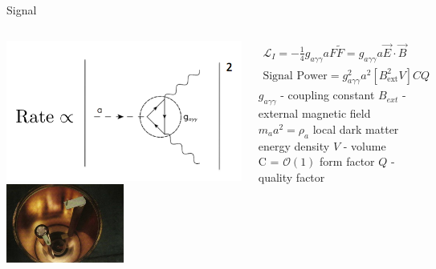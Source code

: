 \documentclass{beamer}
\begin{document}
\begin{frame}{Signal}
\begin{columns}
\begin{center}
\includegraphics[width=.55\textwidth]{rate} \includegraphics[width=0.5\textwidth]{cavity_open}

\end{center}
\begin{align*}
\mathcal{L}_I = - \frac{1}{4}g_{a\gamma \gamma}aF\tilde F = g_{a\gamma \gamma}a\vec{E}\cdot\vec{B}
\end{align*}
\begin{align*}
\text{Signal Power} = g_{a\gamma \gamma}^2 a^2 [B_{\text{ext}}^2 V] C Q
\end{align*}
$g_{a\gamma\gamma}$ - {\tiny coupling constant} \quad $B_{ext}$ - {\tiny external magnetic field}\\
$m_a a^2 = \rho_a$ {\tiny local dark matter energy density}
$V$ - {\tiny volume}\\ C = {\tiny $\mathcal{O}(1)$} {\tiny form factor} \qquad
$Q$ - {\tiny quality factor}
\end{columns}
\end{frame}
\end{document}
